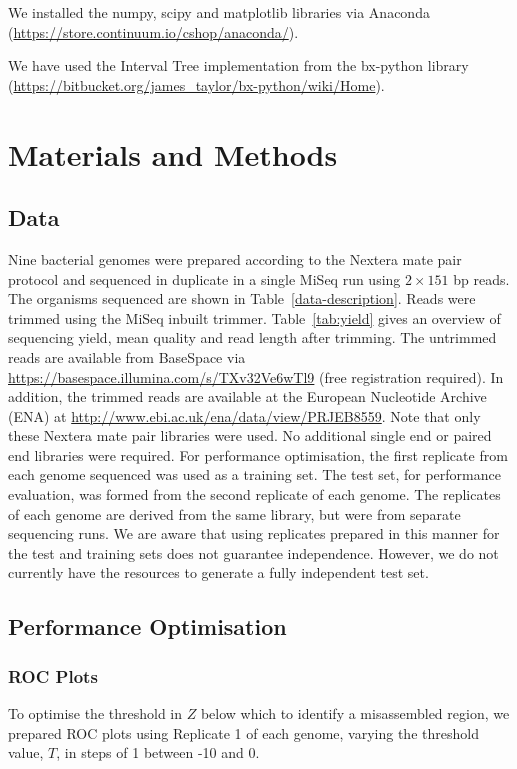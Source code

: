 \documentclass[fleqn,10pt]{wlpeerj}
\begin{document}
We installed the numpy, scipy and matplotlib libraries via Anaconda (\url{https://store.continuum.io/cshop/anaconda/}).

We have used the Interval Tree implementation from the bx-python library (\url{https://bitbucket.org/james_taylor/bx-python/wiki/Home}).   

\section*{Materials and Methods}
\subsection*{Data}
Nine bacterial genomes were prepared according to the Nextera mate pair protocol and sequenced in duplicate in a single MiSeq run using $2 \times 151$ bp reads. The organisms sequenced are shown in Table~\ref{data-description}. Reads were trimmed using the MiSeq inbuilt trimmer. Table~\ref{tab:yield} gives an overview of sequencing yield, mean quality and read length after trimming. The untrimmed reads are available from BaseSpace via \url{https://basespace.illumina.com/s/TXv32Ve6wTl9} (free registration required). In addition,
the trimmed reads are available at the European Nucleotide Archive (ENA) at \url{http://www.ebi.ac.uk/ena/data/view/PRJEB8559}. Note that only these Nextera mate pair libraries were used. No additional single end or paired end libraries were required. For performance optimisation, the first replicate from each genome sequenced was used as a training set. The test set, for performance evaluation, was formed from the second replicate of each genome. The replicates of each genome are derived from the same library, but were from separate sequencing runs. We are aware that using replicates  prepared in this manner for the test and training sets does not guarantee independence. However, we do not currently have the resources to generate a fully independent test set.

\subsection*{Performance Optimisation}
\subsubsection*{ROC Plots}
To optimise the threshold in $Z$ below which to identify a misassembled region, we prepared ROC plots using Replicate 1 of each genome, varying the threshold value, $T$, in steps of 1 between -10 and 0. 
\end{document}
